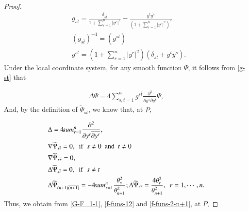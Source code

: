 \documentclass[12pt]{article}
\numberwithin{equation}{section}
\begin{document}
\begin{proof}
\begin{equation}\begin{aligned}\label{g-st}&g_{s\overline{t}}=\frac{\delta_{s\overline{t}}}{1+\sum^{n}_{r=1}
|y^{r}|^{2}}-\frac{y^{t}\overline{y^{s}}}{\left(1+\sum^{n}_{r=1}|y^{r}|^{2}\right)^{2}}\\
&\left(g_{s\overline{t}}\right)^{-1}=\left(g^{s\overline{t}}\right)\\
&g^{s\overline{t}}=\left(1+\sum^{n}_{r=1}|y^{r}|^{2}\right)(\delta_{s\overline{t}}+y^{t}\overline{y^{s}}).\end{aligned}\end{equation}
Under the local coordinate system, for any smooth function $\Psi$, it follows from \eqref{g-st} that

\begin{equation*}\begin{aligned}\Delta \Psi=4\sum^{n}_{s,t=1}g^{s\overline{t}}\frac{\partial^{2}}{\partial y^{s}\overline{\partial y^{t}}} \Psi,\end{aligned}\end{equation*}
And, by the definition of $\widetilde{\Psi}_{s\overline{t}}$, we know that, at $P$,



\begin{equation*}\begin{aligned}&\Delta =4\sum^{n}_{r=1}\frac{\partial^{2}}{\partial y^{r}\overline{\partial y^{r}}},\\
&\nabla \widetilde{\Psi}_{s\overline{t}}= 0, \ \ {\rm  if}\ \  s\neq0\ \  {\rm  and} \ \ t\neq 0\\
&\nabla \widetilde{\Psi}_{s\overline{s}}= 0,\\
&\Delta \widetilde{\Psi}_{s\overline{t}}= 0, \ \ {\rm if} \ \ s\neq t\\
&\Delta \widetilde{\Psi}_{(n+1)\overline{(n+1)}}=-4\sum^{n}_{s=1}\frac{\theta_{s}^{2}}{\theta_{n+1}^{2}}; \Delta \widetilde{\Psi}_{r\overline{r}}=\frac{4\theta_{r}^{2}}{\theta_{n+1}^{2}},\ \ r=1,\cdots,n.
\end{aligned}\end{equation*}
Thus, we obtain from \eqref{G-F=1-1}, \eqref{f-funs-12} and  \eqref{f-funs-2-n+1}, at $P$,



\end{proof}
\end{document}

